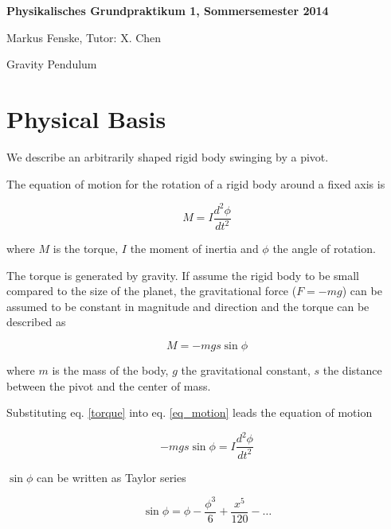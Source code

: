 \documentclass[a4paper,german,12pt,smallheadings]{scrartcl}
\begin{document}
\allowdisplaybreaks %
\begin{center}
\bfseries %
\sffamily %
\vspace{-40pt}
Physikalisches Grundpraktikum 1, Sommersemester 2014

Markus Fenske, Tutor: X. Chen

Gravity Pendulum
\vspace{-10pt}
\end{center}

\section*{Physical Basis}

We describe an arbitrarily shaped rigid body swinging by a pivot.

The equation of motion for the rotation of a rigid body around a fixed axis is

\begin{equation}
  M = I \frac{d^2 \phi}{d t^2}
  \label{eq_motion}
\end{equation}

where $M$ is the torque, $I$ the moment of inertia and $\phi$ the angle of rotation.

The torque is generated by gravity. If assume the rigid body to be small
compared to the size of the planet, the gravitational force ($F = -mg$) can be
assumed to be constant in magnitude and direction  and the torque can be
described as

\begin{equation}
  M = -mg s \sin \phi
  \label{torque}
\end{equation}

where $m$ is the mass of the body, $g$ the gravitational constant, $s$ the
distance between the pivot and the center of mass.

Substituting eq. \ref{torque} into eq. \ref{eq_motion} leads the equation of
motion

\begin{equation}
  -mg s \sin \phi = I \frac{d^2 \phi}{d t^2}
  \label{diff_eq}
\end{equation}

$\sin \phi$ can be written as Taylor series

\begin{equation}
  \sin \phi = \phi - \frac{\phi^3}{6} + \frac{x^5}{120} - \dots
\end{equation}
\end{document}
